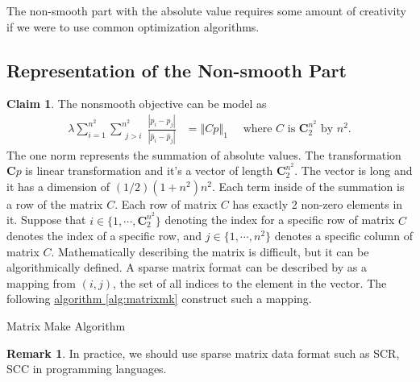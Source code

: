 \documentclass[11pt]{article}
\theoremstyle{definition}
\newtheorem{claim}{Claim}[subsection]
\newtheorem{remark}{Remark}[subsection]
{
    \newtheorem{assumption}{Assumption}
}
\numberwithin{equation}{subsection}
\begin{document}
    The non-smooth part with the absolute value requires some amount of creativity if we were to use common optimization algorithms. 
    \subsection{Representation of the Non-smooth Part}\label{sec:opsplit_model}
        \begin{claim}
            The nonsmooth objective can be model as 
            \begin{align*}
                \lambda \sum_{i=1}^{n^2}\sum_{\substack{j> i}}^{n^2}
                \frac{|p_{i} - p_j|}{|\hat p_{i} - \hat p_j|}
                &= 
                \left\Vert
                    Cp
                \right\Vert_1 \quad 
                \text{ where $C$ is $\mathbf C_2^{n^2}$ by $n^2$}. 
            \end{align*}
            The one norm represents the summation of absolute values. 
            The transformation $\mathbf Cp$ is linear transformation and it's a vector of length $\mathbf C_2^{n^2}$. 
            The vector is long and it has a dimension of $(1/2)(1 +n^2)n^2$. 
            Each term inside of the summation is a row of the matrix $C$. 
            Each row of matrix $C$ has exactly 2 non-zero elements in it. 
            Suppose that $i\in \{1,\cdots,\mathbf C^{n^2}_2\}$ denoting the index for a specific row of matrix $C$ denotes the index of a specific row, and $j\in \{1, \cdots, n^2\}$ denotes a specific column of matrix $C$. 
            Mathematically describing the matrix is difficult, but it can be algorithmically defined.
            A sparse matrix format can be described by as a mapping from $(i,j)$, the set of all indices to the element in the vector. 
            The following 
            \hyperref[alg:matrixmk]{algorithm \ref{alg:matrixmk}}
            construct such a mapping. 
            \begin{algorithm}[H]
                \begin{algorithmic}[1]
                        \ENDIF
                    \ENDFOR
                \ENDFOR
                \end{algorithmic}
                \caption{Matrix Make Algorithm}
                \label{alg:matrixmk}
            \end{algorithm}
            
        \end{claim}
        \begin{remark}
            In practice, we should use sparse matrix data format such as SCR, SCC in programming languages. 
        \end{remark}
\end{document}
